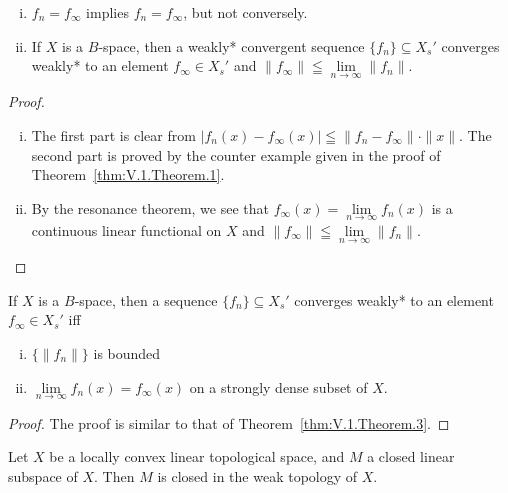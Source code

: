 \begin{theorem}\label{thm:V.1.Theorem.9} \begin{enumerate}[i)]
\item \slim $f_n = f_\infty$ implies \wstarlim $f_n = f_\infty$, but not conversely.
\item If $X$ is a $B$-space, then a weakly* convergent sequence $\{f_n\} \subseteq X_s'$ converges weakly* to an element $f_\infty \in X_s'$ and $\|f_\infty\| \leqq \lim\limits_{n \to \infty} \|f_n\|$.
\end{enumerate}
\end{theorem}

\begin{proof}
 \begin{enumerate}[(i)]
\item The first part is clear from $|f_n(x) - f_\infty(x)| \leqq \|f_n - f_\infty\| \cdot \|x\|$. The second part is proved by the counter example given in the proof of Theorem~\ref{thm:V.1.Theorem.1}.
\item By the resonance theorem, we see that $f_\infty(x) = \lim\limits_{n \to \infty} f_n(x)$ is a continuous linear functional on $X$ and $\|f_\infty\| \leqq \lim\limits_{n \to \infty} \|f_n\|$. \qedhere
\end{enumerate}
\end{proof}

\begin{theorem}\label{thm:V.1.Theorem.10} If $X$ is a $B$-space, then a sequence $\{f_n\} \subseteq X_s'$ converges weakly* to an element $f_\infty \in X_s'$ iff \begin{enumerate}[(i)]
\item $\{\|f_n\|\}$ is bounded
\item $\lim\limits_{n \to \infty} f_n(x) = f_\infty(x)$ on a strongly dense subset of $X$.
\end{enumerate}
\end{theorem}

\begin{proof}
 The proof is similar to that of Theorem~\ref{thm:V.1.Theorem.3}. 
\end{proof}


\begin{theorem}\label{thm:V.1.Theorem.11} Let $X$ be a locally convex linear topological space, and $M$ a closed linear subspace of $X$. Then $M$ is closed in the weak topology of $X$. 
\end{theorem}

